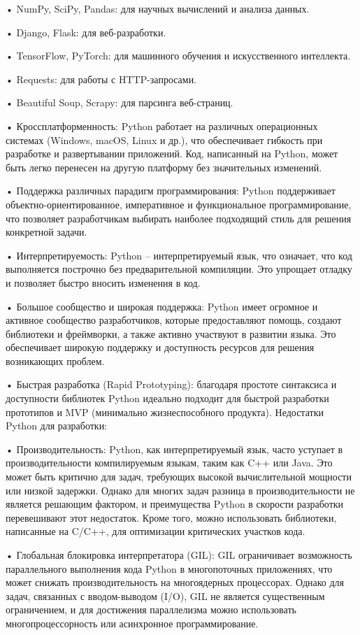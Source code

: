 •	NumPy, SciPy, Pandas: для научных вычислений и анализа данных.

•	Django, Flask: для веб-разработки.

•	TensorFlow, PyTorch: для машинного обучения и искусственного интеллекта.

•	Requests: для работы с HTTP-запросами.

•	Beautiful Soup, Scrapy: для парсинга веб-страниц.

•	Кроссплатформенность: Python работает на различных операционных системах (Windows, macOS, Linux и др.), что обеспечивает гибкость при разработке и развертывании приложений. Код, написанный на Python, может быть легко перенесен на другую платформу без значительных изменений.

•	Поддержка различных парадигм программирования: Python поддерживает объектно-ориентированное, императивное и функциональное программирование, что позволяет разработчикам выбирать наиболее подходящий стиль для решения конкретной задачи.

•	Интерпретируемость: Python – интерпретируемый язык, что означает, что код выполняется построчно без предварительной компиляции. Это упрощает отладку и позволяет быстро вносить изменения в код.

•	Большое сообщество и широкая поддержка: Python имеет огромное и активное сообщество разработчиков, которые предоставляют помощь, создают библиотеки и фреймворки, а также активно участвуют в развитии языка. Это обеспечивает широкую поддержку и доступность ресурсов для решения возникающих проблем.

•	Быстрая разработка (Rapid Prototyping): благодаря простоте синтаксиса и доступности библиотек Python идеально подходит для быстрой разработки прототипов и MVP (минимально жизнеспособного продукта).
Недостатки Python для разработки:

•	Производительность: Python, как интерпретируемый язык, часто уступает в производительности компилируемым языкам, таким как C++ или Java. Это может быть критично для задач, требующих высокой вычислительной мощности или низкой задержки. Однако для многих задач разница в производительности не является решающим фактором, и преимущества Python в скорости разработки перевешивают этот недостаток. Кроме того, можно использовать библиотеки, написанные на C/C++, для оптимизации критических участков кода.

•	Глобальная блокировка интерпретатора (GIL): GIL ограничивает возможность параллельного выполнения кода Python в многопоточных приложениях, что может снижать производительность на многоядерных процессорах. Однако для задач, связанных с вводом-выводом (I/O), GIL не является существенным ограничением, и для достижения параллелизма можно использовать многопроцессорность или асинхронное программирование.

